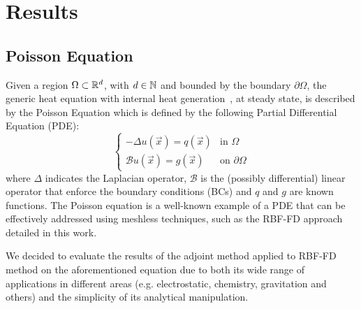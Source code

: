 \chapter{Results}

\section{Poisson Equation}
\label{sec:poisson_equation}

Given a region $\Omega \subset \mathbb{R}^d$, with $d \in \mathbb{N}$ and bounded by the boundary $\partial\Omega$, the generic heat equation with internal heat generation~\cite{Brezis:functional_analysis_book}, at steady state, is described by the Poisson Equation which is defined by the following Partial Differential Equation (PDE):
\begin{equation}
	\label{eqn:Poisson_equation}
	\begin{cases}
		- \Delta u(\vec{x}) = q(\vec{x})														 &  \text{in $\Omega$}							\\
		\mathcal{B} u(\vec{x}) = g(\vec{x})  													 &  \text{on $\partial\Omega$}
	\end{cases}
\end{equation}
where $\Delta$ indicates the Laplacian operator, $\mathcal{B}$ is the (possibly differential) linear operator that enforce the boundary conditions (BCs) and $q$ and $g$ are known functions.
The Poisson equation is a well-known example of a PDE that can be effectively addressed using meshless techniques, such as the RBF-FD approach detailed in this work.

We decided to evaluate the results of the adjoint method applied to RBF-FD method on the aforementioned equation due to both its wide range of applications in different areas	(e.g. electrostatic, chemistry, gravitation and others) and the simplicity of its analytical manipulation.

